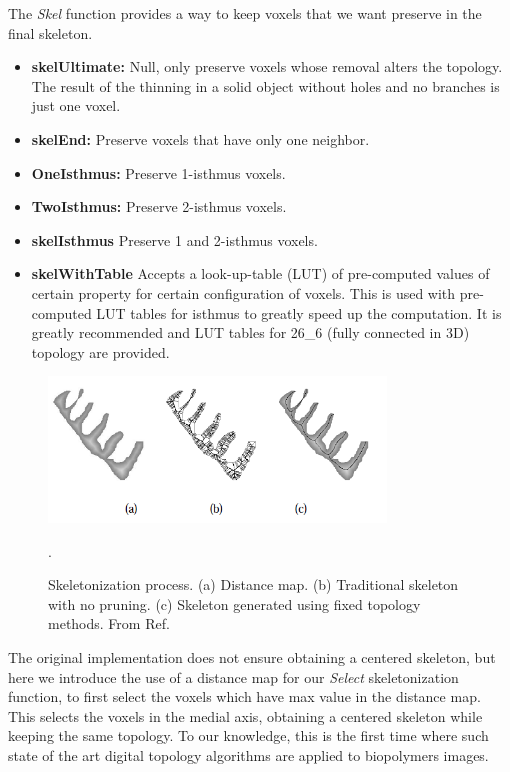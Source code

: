 The \textit{Skel} function provides a way to keep voxels that we want preserve in the final skeleton.

\begin{itemize}[topsep=0pt]
  \item \textbf{skelUltimate: } Null, only preserve voxels whose removal alters the topology.
   The result of the thinning in a solid object without holes and no branches is just one voxel.
  \item \textbf{skelEnd: } Preserve voxels that have only one neighbor.
  \item \textbf{OneIsthmus: } Preserve 1-isthmus voxels.
  \item \textbf{TwoIsthmus: } Preserve 2-isthmus voxels.
  \item \textbf{skelIsthmus } Preserve 1 and 2-isthmus voxels.
  \item \textbf{skelWithTable } Accepts a look-up-table (LUT) of pre-computed values of certain property for certain configuration of voxels. This is used with pre-computed LUT tables for isthmus to greatly speed up the computation. It is greatly recommended and LUT tables for 26\_6 (fully connected in 3D) topology are provided.
\end{itemize}

\begin{figure}[!htb]
\begin{center}
\includegraphics[width=0.8\textwidth]{Figures/chapter-image/skeleton-fixedtopo_letters.png}%
\caption[Skeletonization]{Skeletonization process. (a) Distance
map. (b) Traditional skeleton with no pruning. (c) Skeleton generated using
fixed topology methods. From Ref.\citep{bai_skeleton_2007,golland_fixed_2000}}.
\label{fig:skeleton-fixedtopo}
\end{center}
\end{figure}

The original implementation \cite{couprie_asymmetric_2016} does not ensure obtaining a centered skeleton, but here we introduce the use of a distance map for our \textit{Select} skeletonization function, to first select the voxels which have max value in the distance map. This selects the voxels in the medial axis, obtaining a centered skeleton while keeping the same topology.
To our knowledge, this is the first time where such state of the art digital topology algorithms are applied to biopolymers images.

